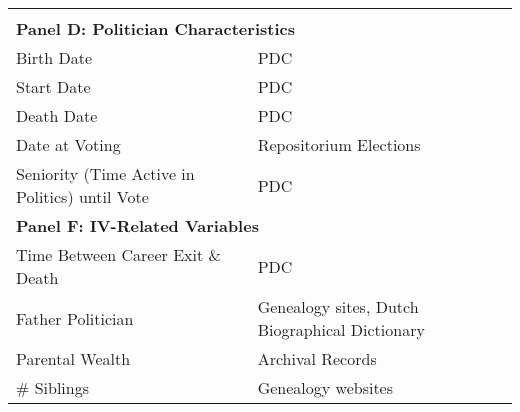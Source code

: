 \begin{table}[!ht]
\begin{tabular}{ll}
     & \\
    \multicolumn{2}{l}{\textbf{Panel D: Politician Characteristics}} \\ \hline
    Birth Date & PDC \\
    Start Date & PDC \\
    Death Date & PDC \\
    Date at Voting & Repositorium Elections \\
    Seniority (Time Active in Politics) until Vote & PDC \\
    \multicolumn{2}{l}{\textbf{Panel F: IV-Related Variables}} \\ \hline
    Time Between Career Exit \& Death & PDC \\
    Father Politician & Genealogy sites, Dutch Biographical Dictionary \\
    Parental Wealth & Archival Records \\
    \# Siblings & Genealogy websites
    \end{tabular}
\end{table}